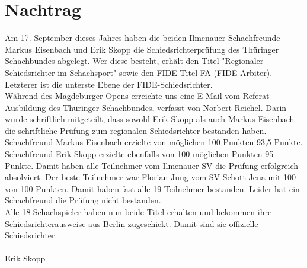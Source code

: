 \documentclass[a4paper,ngerman]{tui-algo-seminar}
\title{\inhalt}
\author{Erik Skopp}
\newcommand{\inhalt}{Nachtrag zur RSR-Ausbildung 2023}
\begin{document}
\nolinenumbers
\maketitle
\thispagestyle{plain} %
\begin{abstract}
Bericht: \inhalt
\end{abstract}

\section{Nachtrag}
Am 17. September dieses Jahres haben die beiden Ilmenauer Schachfreunde Markus Eisenbach und Erik Skopp die Schiedsrichterprüfung des Thüringer Schachbundes abgelegt. Wer diese besteht, erhält den Titel "Regionaler Schiedsrichter im Schachsport" sowie den FIDE-Titel FA (FIDE Arbiter). Letzterer ist die unterste Ebene der FIDE-Schiedsrichter.\\
Während des Magdeburger Opens erreichte uns eine E-Mail vom Referat Ausbildung des Thüringer Schachbundes, verfasst von Norbert Reichel. Darin wurde schriftlich mitgeteilt, dass sowohl Erik Skopp als auch Markus Eisenbach die schriftliche Prüfung zum regionalen Schiedsrichter bestanden haben. Schachfreund Markus Eisenbach erzielte von möglichen 100 Punkten 93,5 Punkte. Schachfreund Erik Skopp erzielte ebenfalls von 100 möglichen Punkten 95 Punkte. Damit haben alle Teilnehmer vom Ilmenauer SV die Prüfung erfolgreich absolviert. Der beste Teilnehmer war Florian Jung vom SV Schott Jena mit 100 von 100 Punkten. Damit haben fast alle 19 Teilnehmer bestanden. Leider hat ein Schachfreund die Prüfung nicht bestanden.\\
Alle 18 Schachspieler haben nun beide Titel erhalten und bekommen ihre Schiedsrichterausweise aus Berlin zugeschickt. Damit sind sie offizielle Schiedsrichter.\\
\\
Erik Skopp
\end{document}
